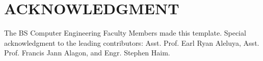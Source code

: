 \chapter*{ACKNOWLEDGMENT}
    The BS Computer Engineering Faculty Members made this template. Special acknowledgment to the leading contributors: Asst. Prof. Earl Ryan Aleluya, Asst. Prof. Francis Jann Alagon, and Engr. Stephen Haim. 

{}